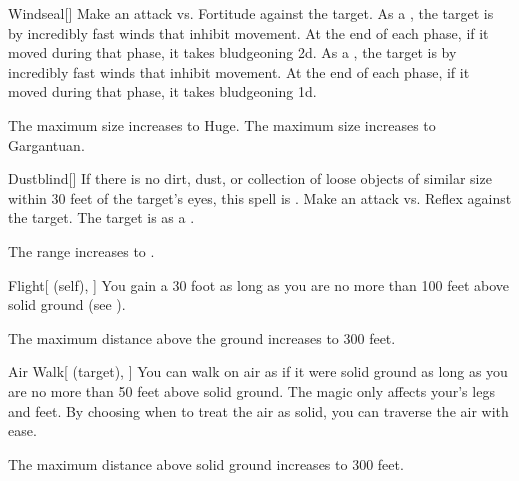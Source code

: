 \lowercase{\hypertarget{spell:Windseal}{}}\label{spell:Windseal}
\begin{freeability}[Rank 4]{\hypertarget{spell:Windseal}{Windseal}}[]
Make an attack vs. Fortitude against the target.
\hit As a , the target is  by incredibly fast winds that inhibit movement.
At the end of each phase, if it moved during that phase, it takes bludgeoning  \minus2d.
\crit As a , the target is  by incredibly fast winds that inhibit movement.
At the end of each phase, if it moved during that phase, it takes bludgeoning  \plus1d.

\rankline
{} The maximum size increases to Huge.
 The maximum size increases to Gargantuan.
\end{freeability}
\vspace{0.25em}



\lowercase{\hypertarget{spell:Dustblind}{}}\label{spell:Dustblind}
\begin{freeability}[Rank 5]{\hypertarget{spell:Dustblind}{Dustblind}}[]
If there is no dirt, dust, or collection of loose objects of similar size within 30 feet of the target's eyes, this spell is .
Make an attack vs. Reflex against the target.
\hit The target is  as a .

\rankline
{} The range increases to \rnglong.
\end{freeability}
\vspace{0.25em}



\lowercase{\hypertarget{spell:Flight}{}}\label{spell:Flight}
\begin{attuneability}[Rank 5]{\hypertarget{spell:Flight}{Flight}}[ (self), ]
You gain a 30 foot  as long as you are no more than 100 feet above solid ground (see ).

\rankline
{} The maximum distance above the ground increases to 300 feet.
\end{attuneability}
\vspace{0.25em}



\lowercase{\hypertarget{spell:Air Walk}{}}\label{spell:Air Walk}
\begin{attuneability}[Rank 6]{\hypertarget{spell:Air Walk}{Air Walk}}[ (target), ]
You can walk on air as if it were solid ground as long as you are no more than 50 feet above solid ground.
The magic only affects your's legs and feet.
By choosing when to treat the air as solid, you can traverse the air with ease.

\rankline
{} The maximum distance above solid ground increases to 300 feet.
\end{attuneability}
\vspace{0.25em}



